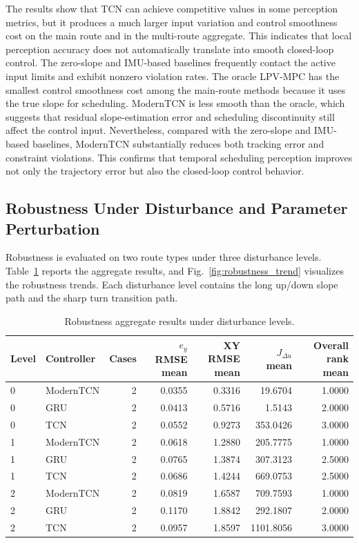 \documentclass{ieeeaccess}
\begin{document}
The results show that TCN can achieve competitive values in some perception metrics, but it produces a much larger input variation and control smoothness cost on the main route and in the multi-route aggregate. This indicates that local perception accuracy does not automatically translate into smooth closed-loop control. The zero-slope and IMU-based baselines frequently contact the active input limits and exhibit nonzero violation rates. The oracle LPV-MPC has the smallest control smoothness cost among the main-route methods because it uses the true slope for scheduling. ModernTCN is less smooth than the oracle, which suggests that residual slope-estimation error and scheduling discontinuity still affect the control input. Nevertheless, compared with the zero-slope and IMU-based baselines, ModernTCN substantially reduces both tracking error and constraint violations. This confirms that temporal scheduling perception improves not only the trajectory error but also the closed-loop control behavior.



\subsection{Robustness Under Disturbance and Parameter Perturbation}



Robustness is evaluated on two route types under three disturbance levels. Table~\ref{tab:robustness_aggregate} reports the aggregate results, and Fig.~\ref{fig:robustness_trend} visualizes the robustness trends. Each disturbance level contains the long up/down slope path and the sharp turn transition path.

\begin{table}[!t]
\centering
\caption{Robustness aggregate results under disturbance levels.}
\label{tab:robustness_aggregate}
\footnotesize
\begin{tabular}{llrrrrr}
\hline
Level & Controller & Cases & $e_y$ RMSE mean & XY RMSE mean & $J_{\Delta u}$ mean & Overall rank mean \\
\hline
0 & ModernTCN & 2 & 0.0355 & 0.3316 & 19.6704 & 1.0000 \\
0 & GRU & 2 & 0.0413 & 0.5716 & 1.5143 & 2.0000 \\
0 & TCN & 2 & 0.0552 & 0.9273 & 353.0426 & 3.0000 \\
1 & ModernTCN & 2 & 0.0618 & 1.2880 & 205.7775 & 1.0000 \\
1 & GRU & 2 & 0.0765 & 1.3874 & 307.3123 & 2.5000 \\
1 & TCN & 2 & 0.0686 & 1.4244 & 669.0753 & 2.5000 \\
2 & ModernTCN & 2 & 0.0819 & 1.6587 & 709.7593 & 1.0000 \\
2 & GRU & 2 & 0.1170 & 1.8842 & 292.1807 & 2.0000 \\
2 & TCN & 2 & 0.0957 & 1.8597 & 1101.8056 & 3.0000 \\
\hline
\end{tabular}
\end{table}
\end{document}
